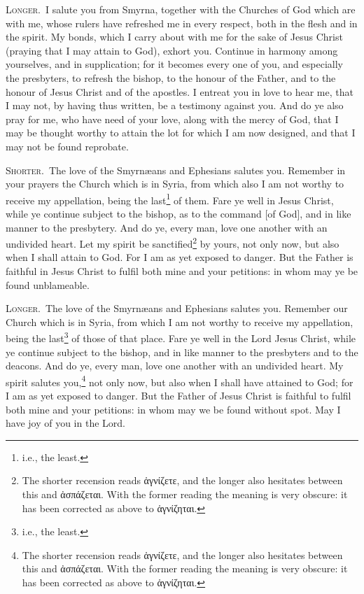 \textsc{Longer.}~I salute you from Smyrna, together with the Churches of God which are with me, whose rulers have refreshed me in every respect, both in the flesh and in the spirit. My bonds, which I carry about with me for the sake of Jesus Christ (praying that I may attain to God), exhort you. Continue in harmony among yourselves, and in supplication; for it becomes every one of you, and especially the presbyters, to refresh the bishop, to the honour of the Father, and to the honour of Jesus Christ and of the apostles. I entreat you in love to hear me, that I may not, by having thus written, be a testimony against you. And do ye also pray for me, who have need of your love, along with the mercy of God, that I may be thought worthy to attain the lot for which I am now designed, and that I may not be found reprobate.


\textsc{Shorter.}~The love of the Smyrnæans and Ephesians salutes you. Remember in your prayers the Church which is in Syria, from which also I am not worthy to receive my appellation, being the last\footnote{i.e., the least.} of them. Fare ye well in Jesus Christ, while ye continue subject to the bishop, as to the command [of God], and in like manner to the presbytery. And do ye, every man, love one another with an undivided heart. Let my spirit be sanctified\footnote{The shorter recension reads \textgreek{ἁγνίζετε}, and the longer also hesitates between this and \textgreek{ἀσπάζεται}. With the former reading the meaning is very obscure: it has been corrected as above to \textgreek{ἁγνίζηται}.} by yours, not only now, but also when I shall attain to God. For I am as yet exposed to danger. But the Father is faithful in Jesus Christ to fulfil both mine and your petitions: in whom may ye be found unblameable.

\textsc{Longer.}~The love of the Smyrnæans and Ephesians salutes you. Remember our Church which is in Syria, from which I am not worthy to receive my appellation, being the last\footnote{i.e., the least.} of those of that place. Fare ye well in the Lord Jesus Christ, while ye continue subject to the bishop, and in like manner to the presbyters and to the deacons. And do ye, every man, love one another with an undivided heart. My spirit salutes you,\footnote{The shorter recension reads \textgreek{ἁγνίζετε}, and the longer also hesitates between this and \textgreek{ἀσπάζεται}. With the former reading the meaning is very obscure: it has been corrected as above to \textgreek{ἁγνίζηται}.} not only now, but also when I shall have attained to God; for I am as yet exposed to danger. But the Father of Jesus Christ is faithful to fulfil both mine and your petitions: in whom may we be found without spot. May I have joy of you in the Lord.

